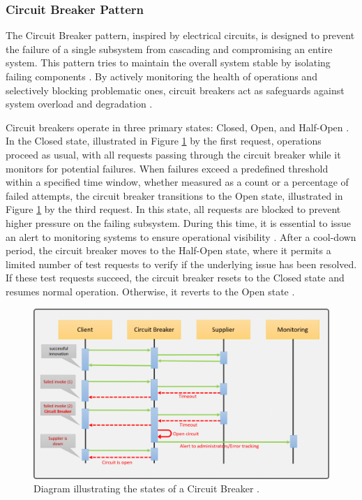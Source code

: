 \subsubsection{Circuit Breaker Pattern}

The Circuit Breaker pattern, inspired by electrical circuits, is designed to prevent the failure of a single subsystem from cascading and compromising an entire system. This pattern tries to maintain the overall system stable by isolating failing components \cite{Vitillo2021}. By actively monitoring the health of operations and selectively blocking problematic ones, circuit breakers act as safeguards against system overload and degradation \cite{fowler-circuit-breakers}.

Circuit breakers operate in three primary states: Closed, Open, and Half-Open \cite{Vitillo2021, fowler-circuit-breakers}. In the Closed state, illustrated in Figure \ref{fig:circuit-breaker} by the first request, operations proceed as usual, with all requests passing through the circuit breaker while it monitors for potential failures. When failures exceed a predefined threshold within a specified time window, whether measured as a count or a percentage of failed attempts, the circuit breaker transitions to the Open state, illustrated in Figure \ref{fig:circuit-breaker} by the third request. In this state, all requests are blocked to prevent higher pressure on the failing subsystem. During this time, it is essential to issue an alert to monitoring systems to ensure operational visibility \cite{Vitillo2021, fowler-circuit-breakers}. After a cool-down period, the circuit breaker moves to the Half-Open state, where it permits a limited number of test requests to verify if the underlying issue has been resolved. If these test requests succeed, the circuit breaker resets to the Closed state and resumes normal operation. Otherwise, it reverts to the Open state \cite{fowler-circuit-breakers}.

\begin{figure}
    \centering
    \includegraphics[width=\linewidth]{ch-background/assets/circuit-breaker.png}
    \caption[Diagram illustrating the states of a Circuit Breaker]{Diagram illustrating the states of a Circuit Breaker \footnotemark.}
    \label{fig:circuit-breaker}
\end{figure}

